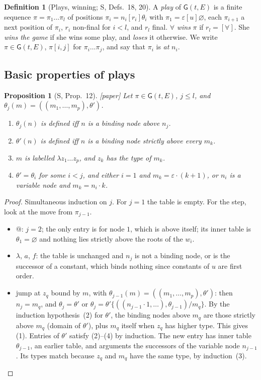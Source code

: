 \documentclass[11pt]{article}
\newcommand{\Gm}{\mathsf{G}}
\newcommand{\suc}[2]{#1{\cdot}#2}
\newcommand{\iv}[2]{\pi[#1,#2]}
\newcommand{\Paper}{\textsf{[paper]}}
\theoremstyle{plain}
\newtheorem{proposition}[theorem]{Proposition}
\theoremstyle{definition}
\newtheorem{definition}[theorem]{Definition}
\theoremstyle{remark}
\begin{document}
\begin{definition}[Plays, winning; S, Defs.~18, 20]
A \emph{play} of $\Gm(t,E)$ is a finite sequence
$\pi=\pi_1\dots\pi_l$ of positions $\pi_i=n_i[r_i]\theta_i$ with
$\pi_1=\varepsilon[u]\varnothing$, each $\pi_{i+1}$ a next position of
$\pi_i$, $r_i$ non-final for $i<l$, and $r_l$ final.  $\forall$
\emph{wins} $\pi$ if $r_l=[\forall]$.  She \emph{wins the game} if she
wins some play, and \emph{loses} it otherwise.  We write
$\pi\in\Gm(t,E)$, $\iv ij$ for $\pi_i\dots\pi_j$, and say that $\pi_i$ is
\emph{at} $n_i$.
\end{definition}

\subsection{Basic properties of plays}

\begin{proposition}[S, Prop.~12]\label{prop:tables}
\Paper{} Let $\pi\in\Gm(t,E)$, $j\le l$, and
$\theta_j(m)=((m_1,\dots,m_p),\theta')$.
\begin{enumerate}
\item $\theta_j(n)$ is defined iff $n$ is a binding node above $n_j$.
\item $\theta'(n)$ is defined iff $n$ is a binding node strictly above
  every $m_k$.
\item $m$ is labelled $\lambda z_1\dots z_p$, and $z_k$ has the type of
  $m_k$.
\item $\theta'=\theta_i$ for some $i<j$, and either $i=1$ and
  $m_k=\suc{\varepsilon}{(k+1)}$, or $n_i$ is a variable node and
  $m_k=\suc{n_i}k$.
\end{enumerate}
\end{proposition}
\begin{proof}
Simultaneous induction on $j$.  For $j=1$ the table is empty.  For the
step, look at the move from $\pi_{j-1}$.
\begin{itemize}
\item $@$: $j=2$; the only entry is for node $1$, which is above itself;
  its inner table is $\theta_1=\varnothing$ and nothing lies strictly above
  the roots of the $w_i$.
\item $\lambda$, $a$, $f$: the table is unchanged and $n_j$ is not a
  binding node, or is the successor of a constant, which binds nothing
  since constants of $u$ are first order.
\item jump at $z_q$ bound by $m$, with
  $\theta_{j-1}(m)=((m_1,\dots,m_p),\theta')$: then $n_j=m_q$, and
  $\theta_j=\theta'$ or
  $\theta_j=\theta'\{((\suc{n_{j-1}}1,\dots),\theta_{j-1})/m_q\}$.  By the
  induction hypothesis~(2) for $\theta'$, the binding nodes above $m_q$
  are those strictly above $m_q$ (domain of $\theta'$), plus $m_q$
  itself when $z_q$ has higher type.  This gives (1).  Entries of
  $\theta'$ satisfy (2)--(4) by induction.  The new entry has inner
  table $\theta_{j-1}$, an earlier table, and arguments the successors
  of the variable node $n_{j-1}$.  Its types match because $z_q$ and
  $m_q$ have the same type, by induction~(3).  \qedhere
\end{itemize}
\end{proof}
\end{document}
